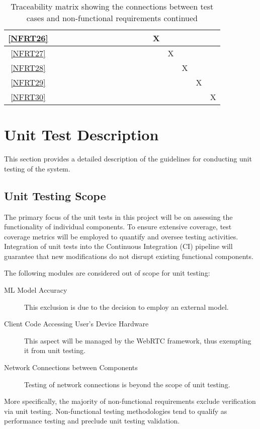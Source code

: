 \documentclass[12pt, titlepage]{article}
\begin{document}
\begin{landscape}
\begin{table}[h!]
\begin{tabular}{|c|c|c|c|c|c|c|c|c|c|c|c|c|c|c|c|c|c|}
      \ref{NFRT26} &      &      &     &     &     &     &     &     &     &     &     &     & X   &     &     &     &     \\ \hline
      \ref{NFRT27} &      &      &     &     &     &     &     &     &     &     &     &     &     & X   &     &     &     \\ \hline
      \ref{NFRT28} &      &      &     &     &     &     &     &     &     &     &     &     &     &     & X   &     &     \\ \hline
      \ref{NFRT29} &      &      &     &     &     &     &     &     &     &     &     &     &     &     &     & X   &     \\ \hline
      \ref{NFRT30} &      &      &     &     &     &     &     &     &     &     &     &     &     &     &     &     & X   \\ \hline
    \end{tabular}
    \caption{Traceability matrix showing the connections between test cases
      and non-functional requirements continued}
    \label{tab:nfrt2}
  \end{table}
\end{landscape}
\restoregeometry

\section{Unit Test Description}

This section provides a detailed description of the guidelines for conducting
unit testing of the system.

\subsection{Unit Testing Scope}

The primary focus of the unit tests in this project will be on assessing the
functionality of individual components. To ensure extensive coverage, test
coverage metrics will be employed to quantify and oversee testing activities.
Integration of unit tests into the Continuous Integration (CI) pipeline will
guarantee that new modifications do not disrupt existing functional components.

The following modules are considered out of scope for unit testing:
\begin{description}
\item[ML Model Accuracy] This exclusion is due to the decision to employ an
  external model.
\item[Client Code Accessing User's Device Hardware] This aspect will be managed by
  the WebRTC framework, thus exempting it from unit testing.
\item[Network Connections between Components] Testing of network connections is
  beyond the scope of unit testing.

\end{description}
More specifically, the majority of non-functional requirements exclude
verification via unit testing. Non-functional testing methodologies tend to
qualify as performance testing and preclude unit testing validation.
\end{document}
